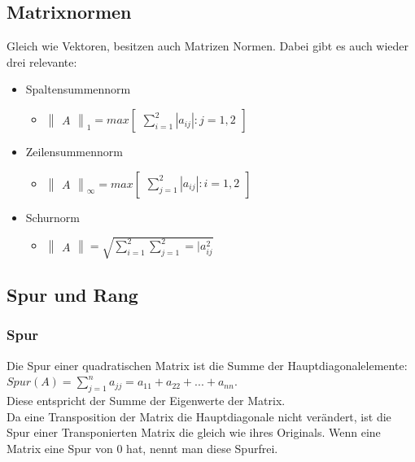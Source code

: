\documentclass{article}
\begin{document}
	\subsection{Matrixnormen}
	Gleich wie Vektoren, besitzen auch Matrizen Normen. Dabei gibt es auch wieder drei relevante:
	\begin{itemize}
		\item{Spaltensummennorm}
		\begin{itemize}
			\item{$\begin{Vmatrix} A \end{Vmatrix}_1=max\begin{bmatrix}\sum_{i=1}^{2}|a_{ij}|:j=1,2\end{bmatrix}$}
		\end{itemize}
		\item{Zeilensummennorm}
		\begin{itemize}
			\item{$\begin{Vmatrix} A \end{Vmatrix}_{\infty}=max \begin{bmatrix} \sum_{j=1}^{2} |a_{ij}|:i=1,2 \end{bmatrix}$}
		\end{itemize}
		\item{Schurnorm}
		\begin{itemize}
			\item{$\begin{Vmatrix} A \end{Vmatrix}=\sqrt{\sum_{i=1}^{2}\sum_{j=1}^{2}=|a_{ij}^2}$}
		\end{itemize}
	\end{itemize}
	\subsection{Spur und Rang}
	\subsubsection{Spur}
	Die Spur einer quadratischen Matrix ist die Summe der Hauptdiagonalelemente: $Spur(A)=\sum_{j=1}^{n}a_{jj}=a_{11}+a_{22}+...+a_{nn}$. \\
	Diese entspricht der Summe der Eigenwerte der Matrix. \\
	Da eine Transposition der Matrix die Hauptdiagonale nicht verändert, ist die Spur einer Transponierten Matrix die gleich wie ihres Originals. Wenn eine Matrix eine Spur von 0 hat, nennt man diese Spurfrei.
\end{document}
